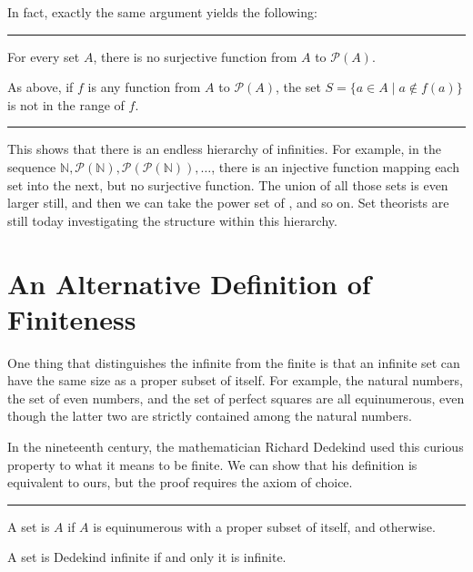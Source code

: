 \documentclass[letterpaper,10pt,english]{sphinxmanual}
\begin{document}
\sphinxAtStartPar
In fact, exactly the same argument yields the following:


\bigskip\hrule\bigskip


\sphinxAtStartPar
{} For every set \(A\), there is no surjective function from \(A\) to \({\mathcal P}(A)\).

\sphinxAtStartPar
{} As above, if \(f\) is any function from \(A\) to \({\mathcal P}(A)\), the set \(S = \{ a \in A \mid a \notin f(a) \}\) is not in the range of \(f\).


\bigskip\hrule\bigskip


\sphinxAtStartPar
This shows that there is an endless hierarchy of infinities. For example, in the sequence \(\mathbb{N}, {\mathcal P}(\mathbb{N}), {\mathcal P}({\mathcal P}(\mathbb{N})), \ldots\), there is an injective function mapping each set into the next, but no surjective function. The union of all those sets is even larger still, and then we can take the power set of , and so on. Set theorists are still today investigating the structure within this hierarchy.


\section{An Alternative Definition of Finiteness}
\label{\detokenize{the_infinite:an-alternative-definition-of-finiteness}}
\sphinxAtStartPar
One thing that distinguishes the infinite from the finite is that an infinite set can have the same size as a proper subset of itself. For example, the natural numbers, the set of even numbers, and the set of perfect squares are all equinumerous, even though the latter two are strictly contained among the natural numbers.

\sphinxAtStartPar
In the nineteenth century, the mathematician Richard Dedekind used this curious property to  what it means to be finite. We can show that his definition is equivalent to ours, but the proof requires the axiom of choice.


\bigskip\hrule\bigskip


\sphinxAtStartPar
{} A set is \(A\)  if \(A\) is equinumerous with a proper subset of itself, and  otherwise.

\sphinxAtStartPar
{} A set is Dedekind infinite if and only it is infinite.
\end{document}
